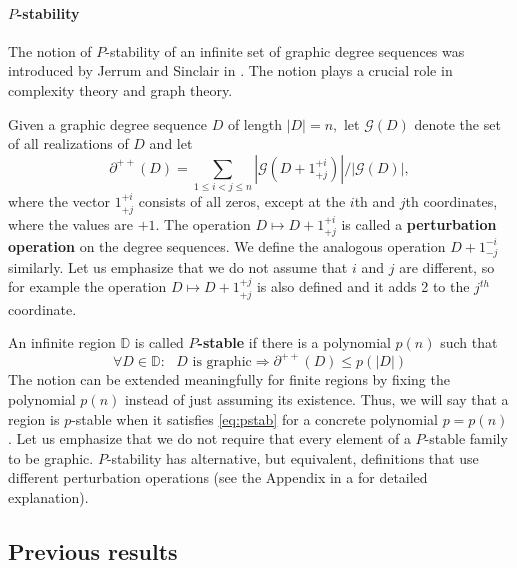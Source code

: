 \documentclass[11pt]{elsarticle}
\theoremstyle{plain}
\theoremstyle{definition}
\def\mD{\mathbb{D}}
\newcommand{\pppp}[1]{\partial^{++}(#1)}
\begin{document}
\paragraph{$P$-stability} The notion of $P$-stability of an infinite set of graphic degree sequences was introduced by Jerrum and Sinclair in \cite{JS90}. The notion plays a crucial role in complexity theory and graph theory.

Given a graphic degree sequence ${D}$ of length $|D|=n,$ let $\mathcal{G}(D)$ denote the set of all realizations of $D$ and let
\begin{equation}\label{eq:localP}
\pppp {{D}}=\sum_{1\le i< j\le n}{|\mathcal{G}({D}+1^{+i}_{+j})|}/{|\mathcal{G}({D})|},
\end{equation}
where the vector $1^{+i}_{+j}$  consists of all zeros, except at the $i$th and $j$th coordinates, where the values are $+1$. The operation $D\mapsto {D}+1^{+i}_{+j}$  is called  a \textbf{perturbation operation} on the degree sequences. We define the analogous operation $D+1^{-i}_{-j}$ similarly. Let us emphasize that we do not assume that $i$ and $j$ are different, so for example the operation $D \mapsto D+1^{+j}_{+j}$ is also  defined and it adds 2 to the $j^{th}$ coordinate.

An infinite region $\mD$ is called {\bf $P$-stable } if there is a polynomial $p(n)$ such that
\begin{equation}\label{eq:pstab}
\forall D \in \mD: \mbox{ $D$ is graphic} \Rightarrow \pppp{{D}}\le p(|{D}|)
\end{equation}
 The notion can be extended meaningfully for finite regions by fixing the polynomial $p(n)$ instead of just assuming its existence. Thus, we will say that a region is $p$-stable when it satisfies \eqref{eq:pstab} for a concrete polynomial $p = p(n)$. Let us emphasize that we do not require that   every element of a $P$-stable family to be graphic. $P$-stability has alternative, but equivalent, definitions  that use different perturbation operations (see the Appendix in \cite{fully} a for detailed explanation).

\subsection{Previous results}\label{sec:old_results}
\end{document}

